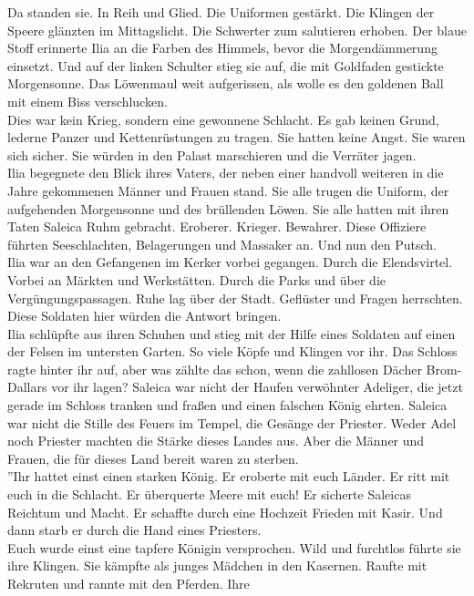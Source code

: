 Da standen sie. In Reih und Glied. Die Uniformen gestärkt. Die Klingen der Speere glänzten im 
Mittagslicht. Die Schwerter zum salutieren erhoben. Der blaue Stoff erinnerte Ilia an die 
Farben des Himmels, bevor die Morgendämmerung einsetzt. Und auf der linken Schulter stieg sie 
auf, die mit Goldfaden gestickte Morgensonne. Das Löwenmaul weit aufgerissen, als wolle es den 
goldenen Ball mit einem Biss verschlucken.\\
Dies war kein Krieg, sondern eine gewonnene Schlacht. Es gab keinen Grund, lederne Panzer und 
Kettenrüstungen zu tragen. Sie hatten keine Angst. Sie waren sich sicher. Sie würden in den Palast 
marschieren und die Verräter jagen.\\
Ilia begegnete den Blick ihres Vaters, der neben einer handvoll weiteren in die Jahre gekommenen 
Männer und Frauen stand. Sie alle trugen die Uniform, der aufgehenden Morgensonne und des 
brüllenden Löwen. Sie alle hatten mit ihren Taten Saleica Ruhm gebracht. Eroberer. Krieger. 
Bewahrer. Diese Offiziere führten Seeschlachten, Belagerungen und Massaker an. Und nun den Putsch.\\
Ilia war an den Gefangenen im Kerker vorbei gegangen. Durch die Elendsvirtel. Vorbei an Märkten und 
Werkstätten. Durch die Parks und über die Vergüngungspassagen. Ruhe lag über der Stadt. Geflüster 
und Fragen herrschten. Diese Soldaten hier würden die Antwort bringen.\\
Ilia schlüpfte aus ihren Schuhen und stieg mit der Hilfe eines Soldaten auf einen der 
Felsen im untersten Garten. So viele Köpfe und Klingen vor ihr. Das Schloss ragte hinter ihr auf, 
aber was zählte das schon, wenn die zahllosen Dächer Brom-Dallars vor ihr lagen? Saleica war nicht 
der Haufen verwöhnter Adeliger, die jetzt gerade im Schloss tranken und fraßen und einen falschen 
König ehrten. Saleica war nicht die Stille des Feuers im Tempel, die Gesänge der Priester. Weder 
Adel noch Priester machten die Stärke dieses Landes aus. Aber die Männer und Frauen, die für dieses 
Land bereit waren zu sterben.\\
''Ihr hattet einst einen starken König. Er eroberte mit euch Länder. Er ritt mit euch in die 
Schlacht. Er überquerte Meere mit euch! Er sicherte Saleicas Reichtum und Macht. Er schaffte durch 
eine Hochzeit Frieden mit Kasir. Und dann starb er durch die Hand eines Priesters.\\
Euch wurde einst eine tapfere Königin versprochen. Wild und furchtlos führte sie ihre Klingen. Sie 
kämpfte als junges Mädchen in den Kasernen. Raufte mit Rekruten und rannte mit den Pferden. Ihre 

